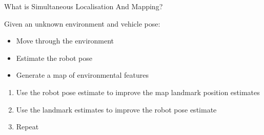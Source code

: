\documentclass[compress]{beamer}
\begin{document}
\begin{frame}{What is Simultaneous Localisation And Mapping?}

    Given an unknown environment and vehicle pose:

    \begin{itemize}
        \item Move through the environment
        \item Estimate the robot pose
        \item Generate a map of environmental features
    \end{itemize}

    \begin{enumerate}
        \item Use the robot pose estimate to improve the map landmark position
            estimates

        \item Use the landmark estimates to improve the robot pose estimate

        \item Repeat
    \end{enumerate}
\end{frame}
\end{document}
